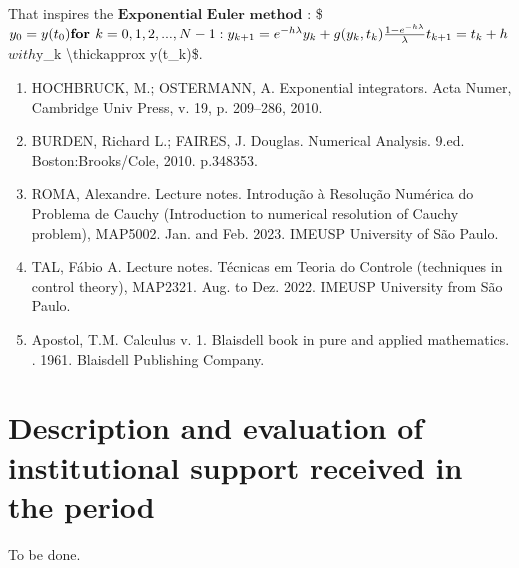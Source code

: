 \documentclass[letterpaper,10pt,english]{jupyterBook}
\begin{document}
\sphinxAtStartPar
That inspires the \(\textbf{Exponential Euler method}\) :
\$\(
y_0 = y(t_0)\\
\textbf{for } k = 0, 1, 2, ..., N-1 :\\
    y_{k+1} = e^{-h \lambda}y_k + g(y_k, t_k) \frac{1-e^{-h \lambda}}{\lambda}\\
    t_{k+1} = t_k + h
\)\(
with \)y\_k \textbackslash{}thickapprox y(t\_k)\$.

\sphinxstepscope
\begin{enumerate}
%
\item {} 
\sphinxAtStartPar
HOCHBRUCK, M.; OSTERMANN, A. Exponential integrators. Acta Numer, Cambridge Univ Press, v. 19, p. 209–286, 2010.

\item {} 
\sphinxAtStartPar
BURDEN, Richard L.; FAIRES, J. Douglas. Numerical Analysis. 9.ed. Boston:Brooks/Cole, 2010. p.348\sphinxhyphen{}353.

\item {} 
\sphinxAtStartPar
ROMA, Alexandre. Lecture notes. Introdução à Resolução Numérica do Problema de Cauchy (Introduction to numerical resolution of Cauchy problem), MAP5002. Jan. and Feb. 2023. IME\sphinxhyphen{}USP University of São Paulo.

\item {} 
\sphinxAtStartPar
TAL, Fábio A. Lecture notes. Técnicas em Teoria do Controle (techniques in control theory), MAP2321. Aug. to Dez. 2022. IME\sphinxhyphen{}USP University from São Paulo.

\item {} 
\sphinxAtStartPar
Apostol, T.M. Calculus v. 1. Blaisdell book in pure and applied mathematics. . 1961. Blaisdell Publishing Company.

\end{enumerate}

\sphinxstepscope


\chapter{Description and evaluation of institutional support received in the period}
\label{\detokenize{Description_and_evaluation_of_institutional_support_received_in_the_period:description-and-evaluation-of-institutional-support-received-in-the-period}}\label{\detokenize{Description_and_evaluation_of_institutional_support_received_in_the_period::doc}}
\sphinxAtStartPar
To be done.
\end{document}
